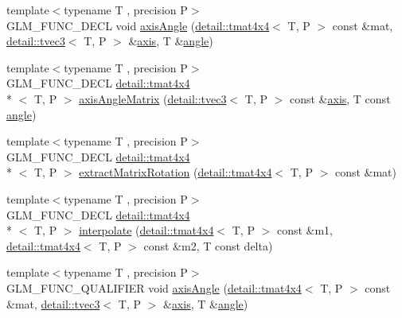 \begin{DoxyCompactItemize}
\item 
{\footnotesize template$<$typename T , precision P$>$ }\\G\-L\-M\-\_\-\-F\-U\-N\-C\-\_\-\-D\-E\-C\-L void \hyperlink{group__gtx__matrix__interpolation_gadf049332345bf754b63fe24a914f8fac}{axis\-Angle} (\hyperlink{structglm_1_1detail_1_1tmat4x4}{detail\-::tmat4x4}$<$ T, P $>$ const \&mat, \hyperlink{structglm_1_1detail_1_1tvec3}{detail\-::tvec3}$<$ T, P $>$ \&\hyperlink{group__gtc__quaternion_ga8eef9f8c3f2e4836dccf09df975b20fb}{axis}, T \&\hyperlink{group__gtc__quaternion_ga23a3fc7ada5bbb665ff84c92c6e0542c}{angle})
\item 
{\footnotesize template$<$typename T , precision P$>$ }\\G\-L\-M\-\_\-\-F\-U\-N\-C\-\_\-\-D\-E\-C\-L \hyperlink{structglm_1_1detail_1_1tmat4x4}{detail\-::tmat4x4}\\*
$<$ T, P $>$ \hyperlink{group__gtx__matrix__interpolation_gafc6982aa7c8e8198b21f038f51fc4b90}{axis\-Angle\-Matrix} (\hyperlink{structglm_1_1detail_1_1tvec3}{detail\-::tvec3}$<$ T, P $>$ const \&\hyperlink{group__gtc__quaternion_ga8eef9f8c3f2e4836dccf09df975b20fb}{axis}, T const \hyperlink{group__gtc__quaternion_ga23a3fc7ada5bbb665ff84c92c6e0542c}{angle})
\item 
{\footnotesize template$<$typename T , precision P$>$ }\\G\-L\-M\-\_\-\-F\-U\-N\-C\-\_\-\-D\-E\-C\-L \hyperlink{structglm_1_1detail_1_1tmat4x4}{detail\-::tmat4x4}\\*
$<$ T, P $>$ \hyperlink{group__gtx__matrix__interpolation_gacb1e3e76c1710d89a1852d87d58c021e}{extract\-Matrix\-Rotation} (\hyperlink{structglm_1_1detail_1_1tmat4x4}{detail\-::tmat4x4}$<$ T, P $>$ const \&mat)
\item 
{\footnotesize template$<$typename T , precision P$>$ }\\G\-L\-M\-\_\-\-F\-U\-N\-C\-\_\-\-D\-E\-C\-L \hyperlink{structglm_1_1detail_1_1tmat4x4}{detail\-::tmat4x4}\\*
$<$ T, P $>$ \hyperlink{group__gtx__matrix__interpolation_gad7dbb702234767be1b4d3c191a2327ac}{interpolate} (\hyperlink{structglm_1_1detail_1_1tmat4x4}{detail\-::tmat4x4}$<$ T, P $>$ const \&m1, \hyperlink{structglm_1_1detail_1_1tmat4x4}{detail\-::tmat4x4}$<$ T, P $>$ const \&m2, T const delta)
\item 
{\footnotesize template$<$typename T , precision P$>$ }\\G\-L\-M\-\_\-\-F\-U\-N\-C\-\_\-\-Q\-U\-A\-L\-I\-F\-I\-E\-R void \hyperlink{group__gtx__matrix__interpolation_gadf049332345bf754b63fe24a914f8fac}{axis\-Angle} (\hyperlink{structglm_1_1detail_1_1tmat4x4}{detail\-::tmat4x4}$<$ T, P $>$ const \&mat, \hyperlink{structglm_1_1detail_1_1tvec3}{detail\-::tvec3}$<$ T, P $>$ \&\hyperlink{group__gtc__quaternion_ga8eef9f8c3f2e4836dccf09df975b20fb}{axis}, T \&\hyperlink{group__gtc__quaternion_ga23a3fc7ada5bbb665ff84c92c6e0542c}{angle})

\end{DoxyCompactItemize}

